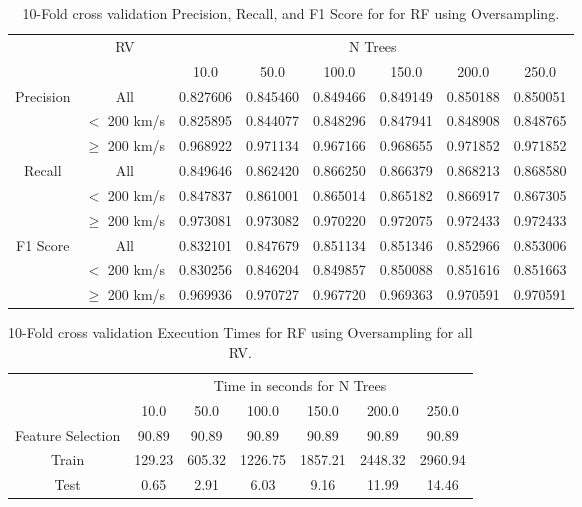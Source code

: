 \documentclass[trackchanges, floatfix, twocolumn, tighten]{aastex62}
\begin{document}
\begin{table}
\centering
\caption{10-Fold cross validation Precision, Recall, and F1 Score for for RF using Oversampling.}
\label{tab:PRFRFD}
	\begin{tabular}{|c|c|c|c|c|c|c|c|}
		\hline
		\multirow{2}{*}{} & \multirow{2}{*}{RV}  & \multicolumn{6}{c|}{N Trees} \\ 
		  &   &  10.0 &     50.0 &    100.0 &    150.0 &    200.0 &    250.0  \\ \hline \hline
		 \multirow{3}{*}{Precision} & All & 0.827606 & 0.845460 & 0.849466 & 0.849149 & 0.850188 & 0.850051 \\ \cline{2-8}
			& $<$ 200 km/s & 0.825895 & 0.844077 & 0.848296 & 0.847941 & 0.848908 & 0.848765 \\ \cline{2-8}
			& $\geq$ 200 km/s & 0.968922 & 0.971134 & 0.967166 & 0.968655 & 0.971852 & 0.971852 \\ \hline \hline
		\multirow{3}{*}{Recall} & All    & 0.849646 & 0.862420 & 0.866250 & 0.866379 & 0.868213 & 0.868580 \\ \cline{2-8}
			& $<$ 200 km/s & 0.847837 & 0.861001 & 0.865014 & 0.865182 & 0.866917 & 0.867305 \\ \cline{2-8}
			& $\geq$ 200 km/s   & 0.973081 & 0.973082 & 0.970220 & 0.972075 & 0.972433 & 0.972433 \\ \hline \hline
		 \multirow{3}{*}{F1 Score} & All  & 0.832101 & 0.847679 & 0.851134 & 0.851346 & 0.852966 & 0.853006 \\ \cline{2-8}
			& $<$ 200 km/s & 0.830256 & 0.846204 & 0.849857 & 0.850088 & 0.851616 & 0.851663 \\ \cline{2-8}
			& $\geq$ 200 km/s  & 0.969936 & 0.970727 & 0.967720 & 0.969363 & 0.970591 & 0.970591 \\ \hline 
	\end{tabular}
\end{table}

\begin{table}
\centering
\caption{10-Fold cross validation Execution Times for RF using Oversampling for all RV.}
\label{tab:RFT}
	\begin{tabular}{|c|c|c|c|c|c|c|}
		\hline
		\multirow{2}{*}{} & \multicolumn{6}{c|}{Time in seconds for N Trees} \\ 
		           &   10.0 &   50.0 &   100.0 &   150.0 &   200.0 &   250.0 \\ \hline
		 Feature Selection & 90.89 & 90.89 & 90.89 & 90.89  &    90.89     &    90.89\\ \hline
		 Train             &  129.23 & 605.32 & 1226.75 & 1857.21 &    2448.32     &    2960.94 \\ \hline
		 Test              &    0.65 &   2.91 &   6.03 &   9.16 &    11.99     &    14.46     \\ \hline
	\end{tabular}
\end{table}
\end{document}
